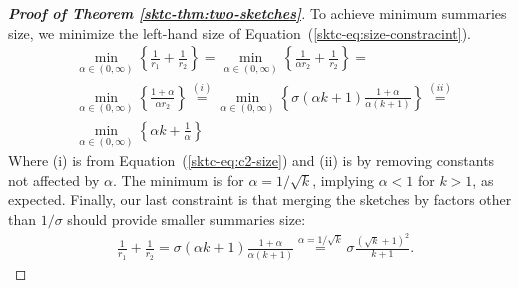 \begin{proof}[\textbf{Proof of Theorem \ref{sktc-thm:two-sketches}}]
\noindent To achieve minimum summaries size, we minimize the left-hand size of  Equation~(\ref{sktc-eq:size-constracint}). 
\begin{align*}
    &\min_{\alpha \in (0, \infty)} \left\{ \frac{1}{r_1} + \frac{1}{r_2} \right\} = \min_{\alpha \in (0, \infty)} \left\{ \frac{1}{\alpha r_2} + \frac{1}{r_2} \right\} = \\
    &\min_{\alpha \in (0, \infty)} \left\{ \frac{1 + \alpha}{\alpha r_2}\right\} \stackrel{(i)}{=} \min_{\alpha \in (0, \infty)} \left\{ \sigma (\alpha k +1) \frac{1+ \alpha}{\alpha(k+1)} \right\} \stackrel{(ii)}{=} \\
    &\min_{\alpha \in (0, \infty)} \left\{ \alpha k + \frac{1}{\alpha} \right\}
\end{align*}
\noindent Where (i) is from Equation~(\ref{sktc-eq:c2-size}) and (ii) is by removing constants not affected by $\alpha$. The minimum is for $\alpha = 1 / \sqrt{k}$, implying $\alpha < 1$ for  $k > 1$, as expected. Finally, our last constraint is that merging the sketches by factors other than $1/\sigma$ should provide smaller summaries size:
\begin{align*}
    &\frac{1}{r_1} + \frac{1}{r_2} = \sigma (\alpha k + 1 ) \frac{1+\alpha}{\alpha (k+1)} \stackrel{\alpha = 1 / \sqrt{k}}{=} \sigma \frac{(\sqrt{k} + 1)^2}{k+1}.
\end{align*}
\end{proof}


